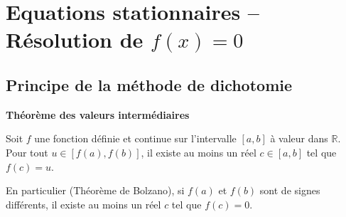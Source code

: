 \def\xxactivite{Cours}
\def\xxauteur{\textsl{Xavier Pessoles}}

\fichefalse
\proftrue
\tdfalse
\courstrue

\def\xxnumchapitre{Chapitre 1 \vspace{.2cm}}
\def\xxchapitre{\hspace{.12cm} Introduction aux méthodes numériques}

\def\xxcompetences{%
\textsl{%
\textbf{Savoirs et compétences :}\\
\begin{itemize}[label=\ding{112},font=\color{ocre}] 
\item C3-02	Résoudre numériquement une équation ou un système d'équations :
\begin{itemize}
\item réécriture des équations d'un problème;
\item résolution de problèmes du type f(x) = 0 (méthodes de dichotomie et de Newton);
\item résolution d'un système linéaire du type $A\cdot X = B$;
\item résolution d'équations différentielles (schéma d'Euler explicite);
\item intégration et dérivation numérique (schémas arrière et avant).
\end{itemize}
\end{itemize}
}}


\def\xxfigures{

}%


\vspace{2cm}
\pagestyle{fancy}
\thispagestyle{plain}


\section{Equations stationnaires -- Résolution de $f(x)=0$}

\subsection{Principe de la méthode de dichotomie}

\begin{theorem}
\textbf{Théorème des valeurs intermédiaires}

Soit $f$ une fonction définie et continue sur l'intervalle $[a,b]$ à valeur dans $\mathbb{R}$. Pour tout $u\in[f(a),f(b)]$, il existe au moins un réel $c\in [a,b]$  tel que $f(c)=u$.

 En particulier (Théorème de Bolzano), si $f(a)$ et $f(b)$ sont de signes différents, il existe au moins un réel $c$ tel que $f(c)=0$. 
\end{theorem}

